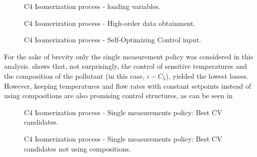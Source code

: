 \documentclass[../../msc-thesis.tex]{subfiles}
\begin{document}
\begin{figure}[htb]
	\centering
	\caption{C4 Isomerization process - loading variables.}
	\label{fig:c4redspace}
\end{figure}

\begin{figure}[htb]
	\centering
	\caption{C4 Isomerization process - High-order data obtainment.}
	\label{fig:c4grad}
\end{figure}

\begin{figure}[htb]
	\centering
	\caption{C4 Isomerization process - Self-Optimizing Control input.}
	\label{fig:c4soc}
\end{figure}

For the sake of brevity only the single measurement policy was considered in 
this analysis.  shows that, not surprisingly, the 
control of sensitive temperatures and the composition of the pollutant 
(in this case, $i-C_{5}$), yielded the lowest losses. However, keeping 
temperatures and flow rates with constant setpoints instead of using 
compositions are also promising control structures, as can be seen in 

\begin{figure}[htb]
	\centering
    \caption{C4 Isomerization process - Single measurements policy: Best 
    CV candidates.}
	\label{fig:c4socresult}
\end{figure}
	
\begin{figure}[htb]
	\centering
    \caption{C4 Isomerization process - Single measurements policy: Best 
    CV candidates not using compositions.}
	\label{fig:c4socresult2}
\end{figure}

\FloatBarrier
\end{document}
